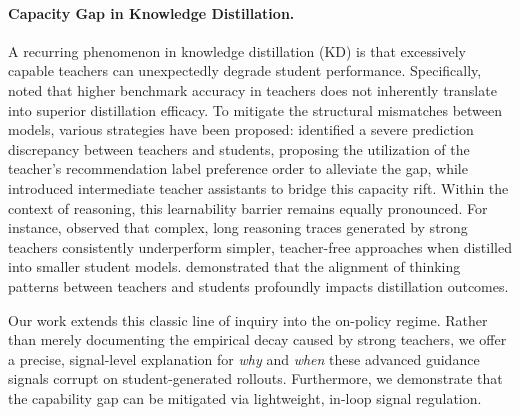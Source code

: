 \documentclass[11pt]{article}
\begin{document}
\paragraph{Capacity Gap in Knowledge Distillation.}

A recurring phenomenon in knowledge distillation (KD) is that excessively capable teachers can unexpectedly degrade student performance. Specifically, \citet{cho2019efficacy} noted that higher benchmark accuracy in teachers does not inherently translate into superior distillation efficacy.  To mitigate the structural mismatches between models, various strategies have been proposed: \citet{kd-from-strong-1} identified a severe prediction discrepancy between teachers and students, proposing the utilization of the teacher's recommendation label preference order to alleviate the gap, while \citet{mirzadeh2020improved} introduced intermediate teacher assistants to bridge this capacity rift.
Within the context of reasoning, this learnability barrier remains equally pronounced. For instance, \citet{li2025learnability} observed that complex, long reasoning traces generated by strong teachers consistently underperform simpler, teacher-free approaches when distilled into smaller student models. \citet{li2026rolereasoningpatternsgeneralization} demonstrated that the alignment of thinking patterns between teachers and students profoundly impacts distillation outcomes.

Our work extends this classic line of inquiry into the on-policy regime.  Rather than merely documenting the empirical decay caused by strong teachers, we offer a precise, signal-level explanation for \emph{why} and \emph{when} these advanced guidance signals corrupt on student-generated rollouts. Furthermore, we demonstrate that the capability gap can be mitigated via lightweight, in-loop signal regulation.
\end{document}
